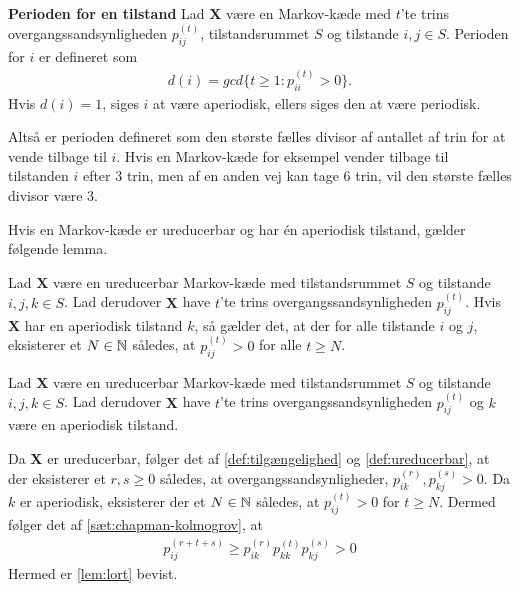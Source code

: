 \begin{minipage}\textwidth
\begin{defn}\textbf{Perioden for en tilstand}\label{def:aperiodisk} %
\newline
Lad $\bm X$ være en Markov-kæde med $t$'te trins overgangssandsynligheden $p_{ij}^{(t)}$, tilstandsrummet $S$ og tilstande $i,j \in S$. Perioden for $i$ er defineret som
\begin{align*}
    d(i) = gcd\{t\geq 1 : p_{ii}^{(t)}>0\}.
\end{align*}
Hvis $d(i)=1$, siges $i$ at være aperiodisk, ellers siges den at være periodisk.
\end{defn}
\end{minipage}

Altså er perioden defineret som den største fælles divisor af antallet af trin for at vende tilbage til $i$. Hvis en Markov-kæde for eksempel vender tilbage til tilstanden $i$ efter $3$ trin, men af en anden vej kan tage $6$ trin, vil den største fælles divisor være $3$. 

Hvis en Markov-kæde er ureducerbar og har én aperiodisk tilstand, gælder følgende lemma. 



\begin{minipage}\textwidth
\begin{lem} \label{lem:lort}\textbf{} %
\newline
Lad $\bm X$ være en ureducerbar Markov-kæde med tilstandsrummet $S$ og tilstande $i, j, k \in S$. Lad derudover $\bm X$ have $t$'te trins overgangssandsynligheden $p_{ij}^{(t)}$. Hvis $\bm X$ har en aperiodisk tilstand $k$, så gælder det, at der for alle tilstande $i$ og $j$, eksisterer et $N\in \mathbb{N}$ således, at $p_{ij}^{(t)}>0$ for alle $t\geq N$. 
\end{lem}
\end{minipage}

\begin{bev} \textbf{} %
\newline
Lad $\bm X$ være en ureducerbar Markov-kæde med tilstandsrummet $S$ og tilstande $i, j, k \in S$. Lad derudover $\bm X$ have $t$'te trins overgangssandsynligheden $p_{ij}^{(t)}$ og $k$ være en aperiodisk tilstand.

Da $\bm X$ er ureducerbar, følger det af \autoref{def:tilgængelighed} og \autoref{def:ureducerbar}, at der eksisterer et $r, s\geq 0$ således, at overgangssandsynligheder, $p_{ik}^{(r)}, p_{kj}^{(s)}>0$. Da $k$ er aperiodisk, eksisterer der et $N\in \mathbb{N}$ således, at $p_{ij}^{(t)}>0$ for $t\geq N$. Dermed følger det af \autoref{sæt:chapman-kolmogrov}, at
\begin{align*}
    p_{ij}^{(r+t+s)}\geq p_{ik}^{(r)}p_{kk}^{(t)}p_{kj}^{(s)}>0
\end{align*}
Hermed er \autoref{lem:lort} bevist. 
\end{bev}

